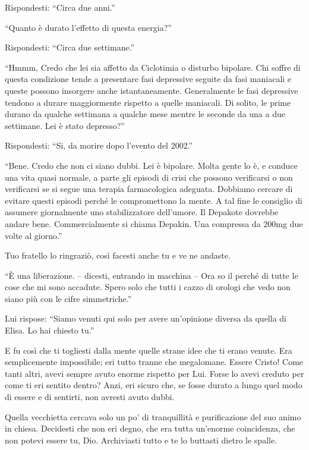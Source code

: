 Rispondesti: “Circa due anni.”

“Quanto è durato l'effetto di questa energia?”

Rispondesti: “Circa due settimane.”

“Hmmm, Credo che lei sia affetto da Ciclotimia o disturbo bipolare. Chi soffre di questa condizione tende a presentare fasi depressive seguite da fasi maniacali e queste possono insorgere anche istantaneamente. Generalmente le fasi depressive tendono a durare maggiormente rispetto a quelle maniacali. Di solito, le prime durano da qualche settimana a qualche mese mentre le seconde da una a due settimane. Lei è stato depresso?”

Rispondesti: “Si, da morire dopo l'evento del 2002.”

“Bene. Credo che non ci siano dubbi. Lei è bipolare. Molta gente lo è, e conduce una vita quasi normale, a parte gli episodi di crisi che possono verificarsi o non verificarsi se si segue una terapia farmacologica adeguata. Dobbiamo cercare di evitare questi episodi perché le compromettono la mente. A tal fine le consiglio di assumere giornalmente uno stabilizzatore dell'umore. Il Depakote dovrebbe andare bene. Commercialmente si chiama Depakin. Una compressa da 200mg due volte al giorno.”

Tuo fratello lo ringraziò, così facesti anche tu e ve ne andaste.

“È una liberazione. -- dicesti, entrando in macchina -- Ora so il perché di tutte le cose che mi sono accadute. Spero solo che tutti i cazzo di orologi che vedo non siano più con le cifre simmetriche.”

Lui rispose: “Siamo venuti qui solo per avere un'opinione diversa da quella di Elisa. Lo hai chiesto tu.”

E fu così che ti togliesti dalla mente quelle strane idee che ti erano venute. Era semplicemente impossibile; eri tutto tranne che megalomane. Essere Cristo! Come tanti altri, avevi sempre avuto enorme rispetto per Lui. Forse lo avevi creduto per come ti eri sentito dentro? Anzi, eri sicuro che, se fosse durato a lungo quel modo di essere e di sentirti, non avresti avuto dubbi.

Quella vecchietta cercava solo un po' di tranquillità e purificazione del suo animo in chiesa. Decidesti che non eri degno, che era tutta un'enorme coincidenza, che non potevi essere tu, Dio. Archiviasti tutto e te lo buttasti dietro le spalle.
